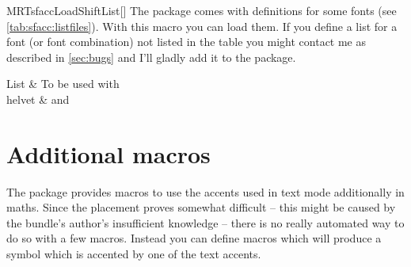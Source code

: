 \begin{describemacro}{MRTsfaccLoadShiftList}[]
  The package comes with definitions for some fonts (see
  \autoref{tab:sfacc:listfiles}). With this macro you can load them. If you
  define a list for a font (or font combination) not listed in the table you
  might contact me as described in \autoref{sec:bugs} and I'll gladly add it
  to the package.
\end{describemacro}

\begin{MRTtable}%
  [
    ,col={>{\ttfamily}l >{\raggedright\arraybackslash}p{.55\linewidth}}
    ,cap={Available shift definition lists}
    ,label={tab:sfacc:listfiles}
  ]
    \normalfont List & To be used with\\
    helvet &  and 
    \\
\end{MRTtable}%

\section{Additional macros}
The package provides macros to use the accents used in text mode additionally in
maths. Since the placement proves somewhat difficult -- this might be caused by
the bundle's author's insufficient knowledge -- there is no really automated way
to do so with a few macros. Instead you can define macros which will produce a
symbol which is accented by one of the text accents.

